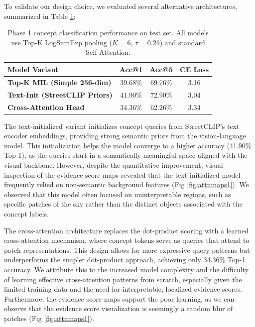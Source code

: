 \documentclass{article}
\begin{document}
To validate our design choice, we evaluated several alternative architectures, summarized in Table \ref{tab:phase1_ablation}:

\begin{table}[h]
\centering
\caption{Phase 1 concept classification performance on test set. All models use Top-K LogSumExp pooling ($K=6$, $\tau=0.25$) and standard Self-Attention.}
\label{tab:phase1_ablation}
\begin{tabular}{lccc}
\toprule
\textbf{Model Variant} & \textbf{Acc@1} & \textbf{Acc@5} & \textbf{CE Loss} \\
\midrule
\textbf{Top-K MIL (Simple 256-dim)} & 39.68\% & 69.76\% & 3.16 \\
\textbf{Text-Init (StreetCLIP Priors)} & 41.90\% & 72.90\% & 3.04 \\
\textbf{Cross-Attention Head} & 34.36\% & 62.26\% & 3.34 \\
\bottomrule
\end{tabular}
\end{table}

The text-initialized variant initializes concept queries from StreetCLIP's text encoder embeddings, providing strong semantic priors from the vision-language model. This initialization helps the model converge to a higher accuracy (41.90\% Top-1), as the queries start in a semantically meaningful space aligned with the visual backbone. However, despite the quantitative improvement, visual inspection of the evidence score maps revealed that the text-initialized model frequently relied on non-semantic background features (Fig \ref{fig:attnmaps1}). We observed that this model often focused on uninterpretable regions, such as specific patches of the sky rather than the distinct objects associated with the concept labels. 

The cross-attention architecture replaces the dot-product scoring with a learned cross-attention mechanism, where concept tokens serve as queries that attend to patch representations. This design allows for more expressive query patterns but underperforms the simpler dot-product approach, achieving only 34.36\% Top-1 accuracy. We attribute this to the increased model complexity and the difficulty of learning effective cross-attention patterns from scratch, especially given the limited training data and the need for interpretable, localized evidence scores. Furthermore, the evidence score maps support the poor learning, as we can observe that the evidence score visualization is seemingly a random blur of patches (Fig \ref{fig:attnmaps1}).
\end{document}
